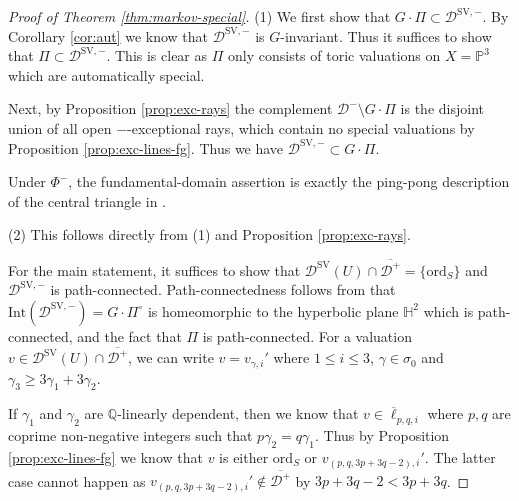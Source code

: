 \documentclass[reqno, 12pt]{amsart}
\theoremstyle{definition}
\newcommand{\bP}{\mathbb{P}}
\newcommand{\bQ}{\mathbb{Q}}
\newcommand{\cD}{\mathcal{D}}
\newcommand{\ord}{\mathrm{ord}}
\newcommand{\SV}{\mathrm{SV}}
\newcommand{\bH}{\mathbb{H}}
\newcommand{\Int}{\mathrm{Int}}
\newcommand{\oell}{\overline{\ell}}
\numberwithin{equation}{section}
\begin{document}
\begin{proof}[Proof of Theorem \ref{thm:markov-special}] 



(1) We first show that $G\cdot \Pi\subset \cD^{\SV, -}$. By Corollary \ref{cor:aut} we know that $\cD^{\SV, -}$ is $G$-invariant. Thus it suffices to show that $\Pi\subset \cD^{\SV,-}$. This is clear as $\Pi$ only consists of toric valuations on $X=\bP^3$ which are automatically special. 

Next, by Proposition \ref{prop:exc-rays} the complement $\cD^-\setminus G\cdot \Pi$ is the disjoint union of all open $-$-exceptional rays, which contain no special valuations by Proposition \ref{prop:exc-lines-fg}. Thus we have $\cD^{\SV, -}\subset G\cdot \Pi$.

Under $\Phi^-$, the fundamental-domain assertion is exactly
the ping-pong description of the central triangle in
\cite[Theorem 9.3]{Jan23}.

(2) This follows directly from (1) and Proposition \ref{prop:exc-rays}.

For the main statement, it suffices to show that $\cD^{\SV}(U)\cap \overline{\cD^+} = \{\ord_S\}$ and $\cD^{\SV, -}$ is path-connected. Path-connectedness follows from \cite[Theorem A]{Jan23} that $\Int(\cD^{\SV,-}) = G\cdot \Pi^{\circ}$ is homeomorphic to the hyperbolic plane $\bH^2$ which is path-connected, and the fact that $\Pi$ is path-connected. For a valuation $v\in \cD^{\SV}(U)\cap \overline{\cD^+}$, we can write $v = v_{\gamma,i}'$ where $1\leq i\leq 3 $,  $\gamma\in \sigma_0$ and $\gamma_3 \geq 3 \gamma_1+3\gamma_2$. 

If $\gamma_1$ and $\gamma_2$ are $\bQ$-linearly dependent, then we know that $v\in \oell_{p,q,i}$ where $p,q$ are coprime non-negative integers such that $p\gamma_2 = q\gamma_1$. Thus by Proposition \ref{prop:exc-lines-fg} we know that $v$ is either $\ord_S$ or $v_{(p,q,3p+3q-2),i}'$. The latter case cannot happen as $v_{(p,q,3p+3q-2),i}'\not\in \overline{\cD^+}$ by $3p+3q -2 < 3p + 3q$. 


\end{proof}
\end{document}
